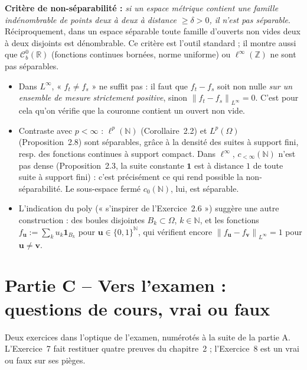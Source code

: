 \documentclass[11pt,a4paper]{article}
\newcommand{\R}{\mathbb{R}}
\newcommand{\N}{\mathbb{N}}
\newcommand{\Z}{\mathbb{Z}}
\newcommand{\norm}[1]{\left\|#1\right\|}
\newcommand{\Cz}{\mathcal{C}^0}
\theoremstyle{definition}
\begin{document}
\begin{pointcle}
\textbf{Critère de non-séparabilité :} \emph{si un espace métrique contient une famille indénombrable de points deux à deux à distance $\ge\delta>0$, il n'est pas séparable}. Réciproquement, dans un espace séparable toute famille d'ouverts non vides deux à deux disjoints est dénombrable. Ce critère est l'outil standard ; il montre aussi que $\Cz_b(\R)$ (fonctions continues bornées, norme uniforme) ou $\ell^\infty(\Z)$ ne sont pas séparables.
\end{pointcle}

\begin{piege}
\begin{itemize}
  \item Dans $L^\infty$, « $f_t\ne f_s$ » ne suffit pas : il faut que $f_t-f_s$ soit non nulle \emph{sur un ensemble de mesure strictement positive}, sinon $\norm{f_t-f_s}_{L^\infty}=0$. C'est pour cela qu'on vérifie que la couronne contient un ouvert non vide.
  \item Contraste avec $p<\infty$ : $\ell^p(\N)$ (Corollaire~2.2) et $L^p(\Omega)$ (Proposition~2.8) sont séparables, grâce à la densité des suites à support fini, resp. des fonctions continues à support compact. Dans $\ell^\infty$, $c_{<\infty}(\N)$ n'est pas dense (Proposition~2.3, la suite constante $\mathbf 1$ est à distance $1$ de toute suite à support fini) : c'est précisément ce qui rend possible la non-séparabilité. Le sous-espace fermé $c_0(\N)$, lui, est séparable.
  \item L'indication du poly (« s'inspirer de l'Exercice~2.6 ») suggère une autre construction : des boules disjointes $B_k\subset\Omega$, $k\in\N$, et les fonctions $f_{\mathbf u}:=\sum_ku_k\mathbf 1_{B_k}$ pour $\mathbf u\in\{0,1\}^\N$, qui vérifient encore $\norm{f_{\mathbf u}-f_{\mathbf v}}_{L^\infty}=1$ pour $\mathbf u\ne\mathbf v$.
\end{itemize}
\end{piege}

\section*{Partie C -- Vers l'examen : questions de cours, vrai ou faux}

\begin{commentaire}
Deux exercices dans l'optique de l'examen, numérotés à la suite de la partie A. L'Exercice~7 fait restituer quatre preuves du chapitre~2 ; l'Exercice~8 est un vrai ou faux sur ses pièges.
\end{commentaire}
\end{document}
